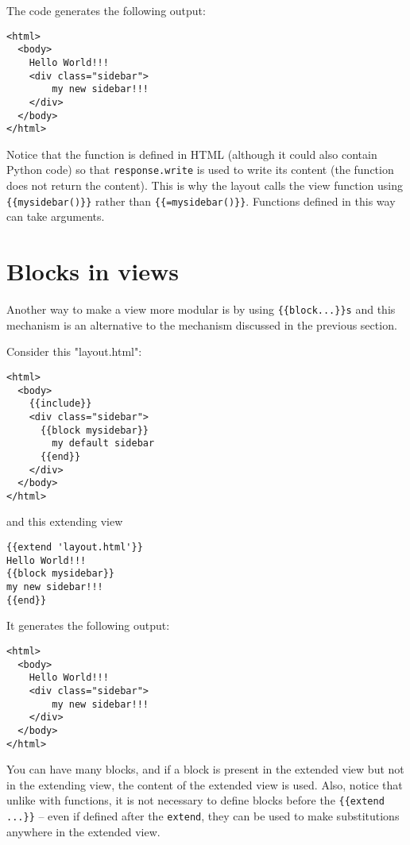 \documentclass[justified,sixbynine,notoc]{tufte-book}
\def\ft{\small\tt}
\def\inxx#1{\index{#1}}
\begin{document}
\begin{fullwidth}
The code generates the following output:

\begin{lstlisting}[keywords={}]
<html>
  <body>
    Hello World!!!
    <div class="sidebar">
        my new sidebar!!!
    </div>
  </body>
</html>
\end{lstlisting}

Notice that the function is defined in HTML (although it could also contain Python code) so that {\ft response.write} is used to write its content (the function does not return the content). This is why the layout calls the view function using {\ft \{\{mysidebar()\}\}} rather than {\ft \{\{=mysidebar()\}\}}. Functions defined in this way can take arguments.

\goodbreak\section{Blocks in views}

\inxx{block}

Another way to make a view more modular is by using {\ft \{\{block...\}\}s} and this mechanism is an alternative to the mechanism discussed in the previous section.

Consider this "layout.html":

\begin{lstlisting}[keywords={}]
<html>
  <body>
    {{include}}
    <div class="sidebar">
      {{block mysidebar}}
        my default sidebar
      {{end}}
    </div>
  </body>
</html>
\end{lstlisting}
\noindent and this extending view

\begin{lstlisting}[keywords={}]
{{extend 'layout.html'}}
Hello World!!!
{{block mysidebar}}
my new sidebar!!!
{{end}}
\end{lstlisting}

It generates the following output:

\begin{lstlisting}[keywords={}]
<html>
  <body>
    Hello World!!!
    <div class="sidebar">
        my new sidebar!!!
    </div>
  </body>
</html>
\end{lstlisting}

You can have many blocks, and if a block is present in the extended view but not in the extending view, the content of the extended view is used. Also, notice that unlike with functions, it is not necessary to define blocks before the {\ft \{\{extend ...\}\}} -- even if defined after the {\ft extend}, they can be used to make substitutions anywhere in the extended view.


\end{fullwidth}
\end{document}
